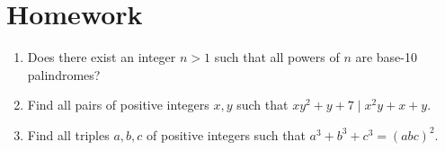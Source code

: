 \documentclass{article}
\begin{document}
\section{Homework}
\begin{enumerate}
	\item Does there exist an integer $n>1$ such that all powers of $n$ are
	      base-10 palindromes?
	\item Find all pairs of positive integers $x,y$ such that $xy^2+y+7\mid
		      x^2y+x+y$.
	\item Find all triples $a,b,c$ of positive integers such that
	      $a^3+b^3+c^3=(abc)^2$.
\end{enumerate}
\end{document}
